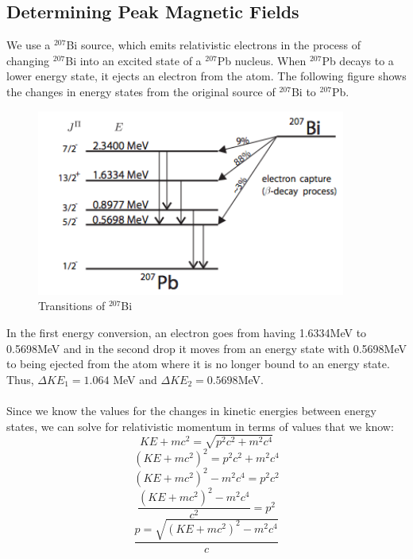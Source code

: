 \subsection{Determining Peak Magnetic Fields}
We use a $^{207}$Bi source, which emits relativistic electrons in the process of changing $^{207}$Bi into an excited state of a $^{207}$Pb nucleus. When $^{207}$Pb decays to a lower energy state, it ejects an electron from the atom. The following figure shows the changes in energy states from the original source of $^{207}$Bi to $^{207}$Pb. \\
\begin{figure}
\begin{center}
\includegraphics[width=4in]{energylevels.png}
\caption{Transitions of $^{207}$Bi}
\end{center}
\end{figure}
In the first energy conversion, an electron goes from having 1.6334MeV to 0.5698MeV and in the second drop it moves from an energy state with 0.5698MeV to being ejected from the atom where it is no longer bound to an energy state. Thus, $\Delta KE_1=1.064$ MeV and $\Delta KE_2= 0.5698$MeV. \\
\\
Since we know the values for the changes in kinetic energies between energy states, we can solve for relativistic momentum in terms of values that we know:
\begin{equation}KE+mc^2=\sqrt{p^2c^2+m^2c^4}\end{equation}
\begin{equation}(KE+mc^2)^2=p^2c^2+m^2c^4\end{equation}
\begin{equation}(KE+mc^2)^2-m^2c^4=p^2c^2\end{equation}
\begin{equation}\frac{(KE+mc^2)^2-m^2c^4}{c^2}=p^2\end{equation}
\begin{equation}\frac{p=\sqrt{(KE+mc^2)^2-m^2c^4}}{c}\end{equation}
